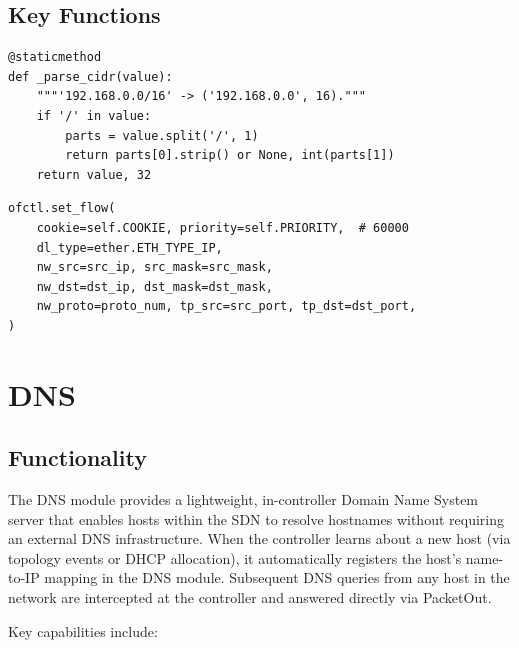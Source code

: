 \documentclass[12pt,a4paper]{article}
\begin{document}
\subsection{Key Functions}

\begin{lstlisting}[caption={CIDR Parsing}]
@staticmethod
def _parse_cidr(value):
    """'192.168.0.0/16' -> ('192.168.0.0', 16)."""
    if '/' in value:
        parts = value.split('/', 1)
        return parts[0].strip() or None, int(parts[1])
    return value, 32
\end{lstlisting}

\begin{lstlisting}[caption={Flow Rule Installation (deny rules at priority 60000)}]
ofctl.set_flow(
    cookie=self.COOKIE, priority=self.PRIORITY,  # 60000
    dl_type=ether.ETH_TYPE_IP,
    nw_src=src_ip, src_mask=src_mask,
    nw_dst=dst_ip, dst_mask=dst_mask,
    nw_proto=proto_num, tp_src=src_port, tp_dst=dst_port,
)
\end{lstlisting}

\section{DNS}

\subsection{Functionality}

The DNS module provides a lightweight, in-controller Domain Name System server that enables hosts within the SDN to resolve hostnames without requiring an external DNS infrastructure. When the controller learns about a new host (via topology events or DHCP allocation), it automatically registers the host's name-to-IP mapping in the DNS module. Subsequent DNS queries from any host in the network are intercepted at the controller and answered directly via PacketOut.

Key capabilities include:
\end{document}

